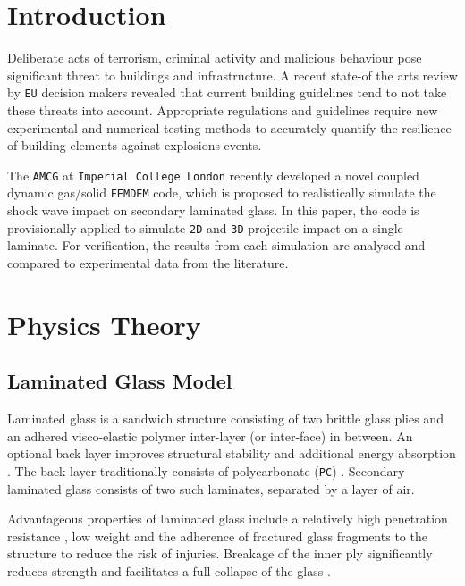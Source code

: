 \documentclass[12pt,twoside]{article}
\theoremstyle{break}
\begin{document}
\section{Introduction}

Deliberate acts of terrorism, criminal activity and malicious behaviour pose significant threat to buildings and infrastructure. A recent state-of the arts review by \texttt{EU} decision makers revealed that current building guidelines tend to not take these threats into account. Appropriate regulations and guidelines require new experimental and numerical testing methods to accurately quantify the resilience of building elements against explosions events.

\bigbreak
The \texttt{AMCG} at \texttt{Imperial College London} recently developed a novel coupled dynamic gas/solid \texttt{FEMDEM} code, which is proposed to realistically simulate the shock wave impact on secondary laminated glass. In this paper, the code is provisionally applied to simulate \texttt{2D} and \texttt{3D} projectile impact on a single laminate. For verification, the results from each simulation are analysed and compared to experimental data from the literature.

\section{Physics Theory}

\subsection{Laminated Glass Model}


Laminated glass is a sandwich structure consisting of two brittle glass plies and an adhered visco-elastic polymer inter-layer (or inter-face) in between. An optional back layer improves structural stability and additional energy absorption \cite{Bio10, Bra10}. The back layer traditionally consists of polycarbonate (\texttt{PC}) \cite{Bra10, Mon04}. Secondary laminated glass consists of two such laminates, separated by a layer of air.

\bigbreak
Advantageous properties of laminated glass include a relatively high penetration resistance \cite{Xu14}, low weight \cite{Wu14} and the adherence of fractured glass fragments to the structure to reduce the risk of injuries\cite{Xu14, Che17, Flo98, Ji98}. Breakage of the inner ply significantly reduces strength and facilitates a full collapse of the glass \cite{Flo98}.
\end{document}
